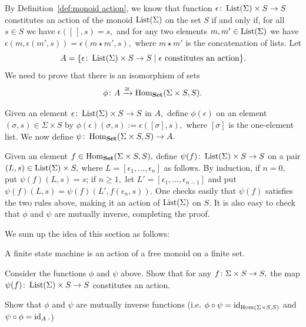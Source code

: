 \documentclass[CT4S-EN-RU]{subfiles}
\begin{document}
\begin{proofENG}
By Definition~\ref{def:monoid action}, we know that function $\epsilon\colon\operatorname{List}(\Sigma)\times S\rightarrow S$ constitutes an action of the monoid $\operatorname{List}(\Sigma)$ on the set $S$ if and only if, for all $s\in S$ we have $\epsilon([\,],s)=s,$ and for any two elements $m,m'\in\operatorname{List}(\Sigma)$ we have $\epsilon(m,\epsilon(m',s))=\epsilon(m\star m',s),$ where $m\star m'$ is the concatenation of lists. Let $$A=\{\epsilon\colon \operatorname{List}(\Sigma)\times S\rightarrow S{\;|\;}\epsilon\textnormal{ constitutes an action}\}.$$ We need to prove that there is an isomorphism of sets $$\phi\colon A\xrightarrow{\cong}\operatorname{Hom}_{\mathbf{Set}}(\Sigma\times S,S).$$

Given an element $\epsilon\colon\operatorname{List}(\Sigma)\times S\rightarrow S$ in $A,$ define $\phi(\epsilon)$ on an element $(\sigma,s)\in\Sigma\times S$ by $\phi(\epsilon)(\sigma,s):=\epsilon([\sigma],s),$ where $[\sigma]$ is the one-element list. We now define $\psi\colon\operatorname{Hom}_{\mathbf{Set}}(\Sigma\times S,S)\rightarrow A.$

Given an element $f\in\operatorname{Hom}_{\mathbf{Set}}(\Sigma\times S,S),$ define $\psi(f)\colon\operatorname{List}(\Sigma)\times S\rightarrow S$ on a pair $(L,s)\in\operatorname{List}(\Sigma)\times S,$ where $L=[\epsilon_1,\ldots,\epsilon_n]$ as follows. By induction, if $n=0,$ put $\psi(f)(L,s)=s$; if $n\geq 1,$ let $L'=[\epsilon_1,\ldots,\epsilon_{n-1}]$ and put $\psi(f)(L,s)=\psi(f)(L',f(\epsilon_n,s)).$ One checks easily that $\psi(f)$ satisfies the two rules above, making it an action of $\operatorname{List}(\Sigma)$ on $S.$ It is also easy to check that $\phi$ and $\psi$ are mutually inverse, completing the proof.
\end{proofENG}

\begin{proofRUS}
\end{proofRUS}

\begin{blockENG}
We sum up the idea of this section as follows:
\begin{sloganENG}
A finite state machine is an action of a free monoid on a finite set.
\end{sloganENG}
\end{blockENG}

\begin{blockRUS}
\end{blockRUS}

\begin{exerciseENG}
Consider the functions $\phi$ and $\psi$ above.
\sexc Show that for any $f\colon\Sigma\times S\rightarrow S,$ the map $\psi(f)\colon\operatorname{List}(\Sigma)\times S\rightarrow S$ constitutes an action.
\item Show that $\phi$ and $\psi$ are mutually inverse functions (i.e. $\phi\circ\psi=\operatorname{id}_{\operatorname{Hom}(\Sigma\times S,S)}$ and $\psi\circ\phi=\operatorname{id}_{A}.$)
\endsexc
\end{exerciseENG}
\end{document}
